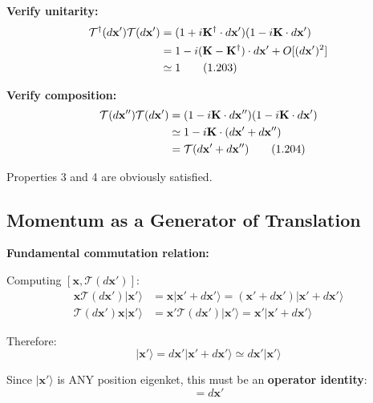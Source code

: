 \documentclass[11pt,a4paper]{article}
\begin{document}
\textbf{Verify unitarity:}
\begin{align}
\mathcal{T}^\dagger(d\mathbf{x}')\mathcal{T}(d\mathbf{x}') &= (1 + i\mathbf{K}^\dagger \cdot d\mathbf{x}')(1 - i\mathbf{K} \cdot d\mathbf{x}') \notag \\
&= 1 - i(\mathbf{K} - \mathbf{K}^\dagger) \cdot d\mathbf{x}' + O[(d\mathbf{x}')^2] \notag \\
&\simeq 1
\tag{1.203}
\end{align}

\textbf{Verify composition:}
\begin{align}
\mathcal{T}(d\mathbf{x}'')\mathcal{T}(d\mathbf{x}') &= (1 - i\mathbf{K} \cdot d\mathbf{x}'')(1 - i\mathbf{K} \cdot d\mathbf{x}') \notag \\
&\simeq 1 - i\mathbf{K} \cdot (d\mathbf{x}' + d\mathbf{x}'') \notag \\
&= \mathcal{T}(d\mathbf{x}' + d\mathbf{x}'')
\tag{1.204}
\end{align}

Properties 3 and 4 are obviously satisfied.

\subsection{Momentum as a Generator of Translation}

\textbf{Fundamental commutation relation:}

Computing $[\mathbf{x}, \mathcal{T}(d\mathbf{x}')]$:
\begin{align}
\mathbf{x}\mathcal{T}(d\mathbf{x}')|\mathbf{x}'\rangle &= \mathbf{x}|\mathbf{x}' + d\mathbf{x}'\rangle = (\mathbf{x}' + d\mathbf{x}')|\mathbf{x}' + d\mathbf{x}'\rangle \tag{1.205a} \\
\mathcal{T}(d\mathbf{x}')\mathbf{x}|\mathbf{x}'\rangle &= \mathbf{x}'\mathcal{T}(d\mathbf{x}')|\mathbf{x}'\rangle = \mathbf{x}'|\mathbf{x}' + d\mathbf{x}'\rangle \tag{1.205b}
\end{align}

Therefore:
\begin{equation}
[\mathbf{x}, \mathcal{T}(d\mathbf{x}')] |\mathbf{x}'\rangle = d\mathbf{x}'|\mathbf{x}' + d\mathbf{x}'\rangle \simeq d\mathbf{x}'|\mathbf{x}'\rangle
\tag{1.206}
\end{equation}

Since $|\mathbf{x}'\rangle$ is ANY position eigenket, this must be an \textbf{operator identity}:
\begin{equation}
[\mathbf{x}, \mathcal{T}(d\mathbf{x}')] = d\mathbf{x}'
\tag{1.207}
\end{equation}
\end{document}
